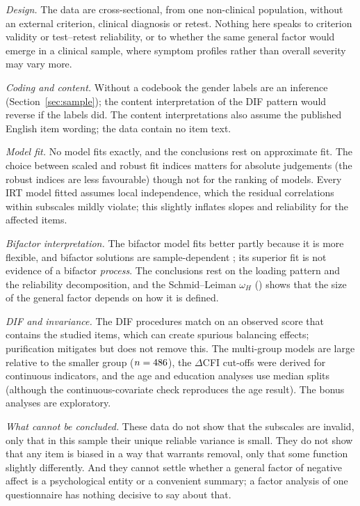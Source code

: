 \documentclass[11pt,a4paper]{article}
\begin{document}
\emph{Design.} The data are cross-sectional, from one non-clinical population, without
an external criterion, clinical diagnosis or retest. Nothing here speaks to criterion
validity or test--retest reliability, or to whether the same general factor would emerge
in a clinical sample, where symptom profiles rather than overall severity may vary more.

\emph{Coding and content.} Without a codebook the gender labels are an inference
(Section~\ref{sec:sample}); the content interpretation of the DIF pattern would reverse if
the labels did. The content interpretations also assume the published English item
wording; the data contain no item text.

\emph{Model fit.} No model fits exactly, and the conclusions rest on approximate fit. The
choice between scaled and robust fit indices matters for absolute judgements (the robust
indices are less favourable) though not for the ranking of models. Every IRT model
fitted assumes local independence, which the residual correlations within subscales
mildly violate; this slightly inflates slopes and reliability for the affected items.

\emph{Bifactor interpretation.} The bifactor model fits better partly because it is more
flexible, and bifactor solutions are sample-dependent
\citep{reise2013multidimensionality}; its superior fit is not evidence of a bifactor
\emph{process}. The conclusions rest on the loading pattern and the reliability
decomposition, and the Schmid--Leiman $\omega_H$ (\OmegaHEFA) shows that the size of the
general factor depends on how it is defined.

\emph{DIF and invariance.} The DIF procedures match on an observed score that contains
the studied items, which can create spurious balancing effects; purification mitigates but
does not remove this. The multi-group models are large relative to the smaller group
($n=486$), the $\Delta$CFI cut-offs were derived for continuous indicators,
and the age and education analyses use median splits (although the continuous-covariate
check reproduces the age result). The bonus analyses are exploratory.

\emph{What cannot be concluded.} These data do not show that the subscales are invalid,
only that in this sample their unique reliable variance is small. They do not show that
any item is biased in a way that warrants removal, only that some function slightly
differently. And they cannot settle whether a general factor of negative affect is a
psychological entity or a convenient summary; a factor analysis of one questionnaire has
nothing decisive to say about that.
\end{document}
